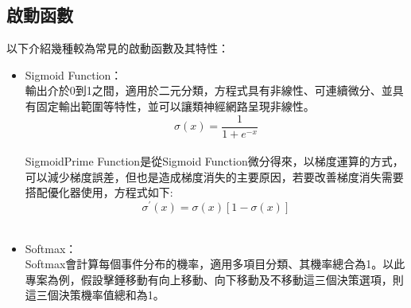 \documentclass[14pt,a4paper]{report}  %
\begin{document}
\subsection{啟動函數}
以下介紹幾種較為常見的啟動函數及其特性：
\begin{itemize}
\item Sigmoid Function：\\
輸出介於0到1之間，適用於二元分類，方程式具有非線性、可連續微分、並具有固定輸出範圍等特性，並可以讓類神經網路呈現非線性。\\
$$\sigma(x)=\frac{1}{1+e^{-x}}$$ \\[6pt]

SigmoidPrime Function是從Sigmoid Function微分得來，以梯度運算的方式，可以減少梯度誤差，但也是造成梯度消失的主要原因，若要改善梯度消失需要搭配優化器使用，方程式如下:\\[12pt]
$$\sigma^{'}(x)=\sigma(x)[1-\sigma(x)]$$\\[3pt]
\item Softmax：\\
Softmax會計算每個事件分布的機率，適用多項目分類、其機率總合為1。以此專案為例，假設擊錘移動有向上移動、向下移動及不移動這三個決策選項，則這三個決策機率值總和為1。\\[12pt]

\end{itemize}
\end{document}
